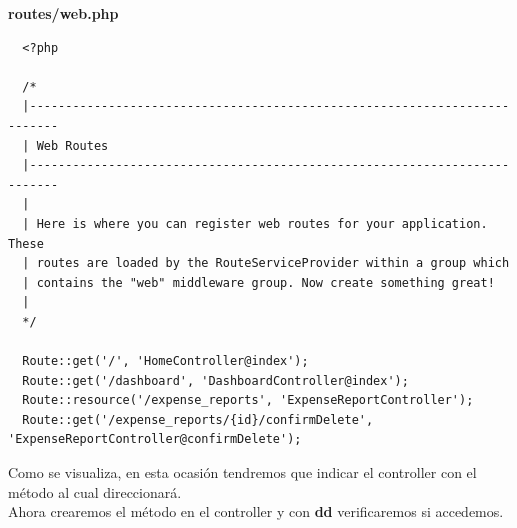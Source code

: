 \documentclass{article}
\begin{document}
\textbf{routes/web.php}
\begin{verbatim}
  <?php

  /*
  |--------------------------------------------------------------------------
  | Web Routes
  |--------------------------------------------------------------------------
  |
  | Here is where you can register web routes for your application. These
  | routes are loaded by the RouteServiceProvider within a group which
  | contains the "web" middleware group. Now create something great!
  |
  */

  Route::get('/', 'HomeController@index');
  Route::get('/dashboard', 'DashboardController@index');
  Route::resource('/expense_reports', 'ExpenseReportController');
  Route::get('/expense_reports/{id}/confirmDelete', 'ExpenseReportController@confirmDelete');
\end{verbatim}

Como se visualiza, en esta ocasión tendremos que indicar el controller con el
método al cual direccionará.\\

Ahora crearemos el método en el controller y con \textbf{dd} verificaremos si
accedemos.\\
\end{document}
